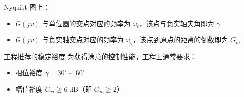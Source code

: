 Nyquist 图上：
\begin{itemize}
    \item $G(j\omega)$ 与单位圆的交点对应的频率为 $\omega_c$，该点与负实轴夹角即为 $\gamma$
    \item $G(j\omega)$ 与负实轴交点对应的频率为 $\omega_g$，该点到原点的距离的倒数即为 $G_m$
\end{itemize}

\begin{myTheorem}{工程推荐的稳定裕度}
为获得满意的控制性能，工程上通常要求：
\begin{itemize}
    \item 相位裕度 $\gamma = 30^{\circ} \sim 60^{\circ}$
    \item 幅值裕度 $G_m \geq 6$ dB（即 $G_m \geq 2$）
\end{itemize}
\end{myTheorem}

